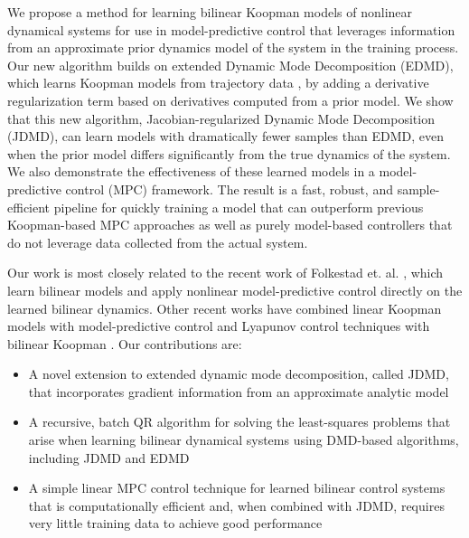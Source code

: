 \documentclass{article}
\begin{document}
We propose a method for learning bilinear Koopman models of nonlinear
dynamical systems for use in model-predictive control that leverages information from an
approximate prior dynamics model of the system in the training process.  Our new algorithm
builds on extended Dynamic Mode Decomposition (EDMD), which learns Koopman models from
trajectory data \cite{Meduri2022,Bruder2021,Korda2018,Folkestad2020,Suh2020}, by adding a
derivative regularization term based on derivatives computed from a prior model.  We show
that this new algorithm, Jacobian-regularized Dynamic Mode Decomposition (JDMD), can learn
models with dramatically fewer samples than EDMD, even when the prior model differs
significantly from the true dynamics of the system.  We also demonstrate the effectiveness
of these learned models in a model-predictive control (MPC) framework.
The result is a fast, robust, and sample-efficient pipeline for quickly training a model
that can outperform previous Koopman-based MPC approaches as well as purely model-based
controllers that do not leverage data collected from the actual system.

Our work is most closely related to the recent work of Folkestad et. al.
\cite{Folkestad2020,Folkestad2021,Folkestad2021a}, which learn bilinear models and apply
nonlinear model-predictive control directly on the learned bilinear dynamics. Other recent
works have combined linear Koopman models with model-predictive control \cite{Korda2018} and
Lyapunov control techniques with bilinear Koopman \cite{Narasingam2022}. Our contributions
are:

\begin{itemize}
  \item A novel extension to extended dynamic mode decomposition, called JDMD, that
  incorporates gradient information from an approximate analytic model
  
  \item A recursive, batch QR algorithm for solving the least-squares problems that arise 
  when learning bilinear dynamical systems using DMD-based algorithms, including JDMD and EDMD
  
  \item A simple linear MPC control technique for learned bilinear control systems that is
  computationally efficient and, when combined with JDMD, requires very little training data
  to achieve good performance
\end{itemize}
\end{document}
